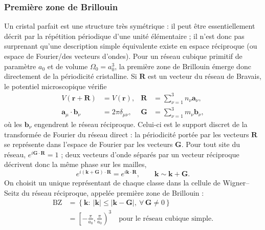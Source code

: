 \subsubsection{Première zone de Brillouin}
Un cristal parfait est une structure très symétrique : il peut être essentiellement décrit par la répétition
périodique d'une unité élémentaire ; il n'est donc pas surprenant qu'une description simple équivalente existe en
espace réciproque (ou espace de Fourier/des vecteurs d'ondes).
Pour un réseau cubique primitif de paramètre $a_0$ et de volume
$\Omega_0=a_0^3$, la première zone de Brillouin émerge donc directement de la
périodicité cristalline. Si $\mathbf R$ est un vecteur du réseau de Bravais, le
potentiel microscopique vérifie
\begin{equation}
\begin{aligned}
V(\mathbf r+\mathbf R)&=V(\mathbf r),
&\mathbf R&=\sum_{\nu=1}^{3}n_\nu\mathbf a_\nu,\\
\mathbf a_\mu\!\cdot\!\mathbf b_\nu&=2\pi\delta_{\mu\nu},
&\mathbf G&=\sum_{\nu=1}^{3}m_\nu\mathbf b_\nu,
\end{aligned}
\label{eq:core_direct_reciprocal_lattices}
\end{equation}
où les $\mathbf b_\nu$ engendrent le réseau réciproque. Celui-ci est le support
discret de la transformée de Fourier du réseau direct : la périodicité portée
par les vecteurs $\mathbf R$ se représente dans l'espace de Fourier par les
vecteurs $\mathbf G$. Pour tout site du réseau,
$e^{i\mathbf G\cdot\mathbf R}=1$ ; deux vecteurs d'onde séparés par un
vecteur réciproque décrivent donc la même phase sur les mailles,
\begin{equation}
e^{i(\mathbf k+\mathbf G)\cdot\mathbf R}
=e^{i\mathbf k\cdot\mathbf R},
\qquad \mathbf k\sim\mathbf k+\mathbf G.
\label{eq:core_k_modulo_G}
\end{equation}
On choisit un unique représentant de chaque classe dans la cellule de
Wigner--Seitz du réseau réciproque, appelée première zone de Brillouin :
\begin{equation}
\begin{aligned}
\mathrm{BZ}
&=\left\{\mathbf k:\ |\mathbf k|\leq|\mathbf k-\mathbf G|,
\ \forall\,\mathbf G\neq0\right\}\\
&=\left[-\frac{\pi}{a_0},\frac{\pi}{a_0}\right)^3
\quad\text{pour le réseau cubique simple}.
\end{aligned}
\label{eq:core_first_brillouin_zone}
\end{equation}

